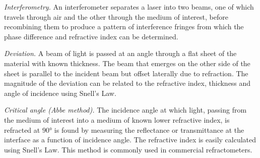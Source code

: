 \documentclass[
    aps,
    prl,
    reprint,
    10pt,
    amsmath,
    amssymb,
    a4paper,
    longbibliography
]{revtex4-2}
\begin{document}
\emph{Interferometry.} An interferometer separates a laser into two beams,
one of which travels through air and the other through the medium of
interest, before recombining them to produce a pattern of interference
fringes from which the phase difference and refractive index can be
determined.

\emph{Deviation.} A beam of light is passed at an angle through a flat
sheet of the material with known thickness. The beam that emerges on the
other side of the sheet is parallel to the incident beam but offset
laterally due to refraction. The magnitude of the deviation can be
related to the refractive index, thickness and angle of incidence using
Snell's Law.

\emph{Critical angle (Abbe method).} The incidence angle at which light,
passing from the medium of interest into a medium of known lower
refractive index, is refracted at $\ang{90}$ is found by measuring the
reflectance or transmittance at the interface as a function of
incidence angle. The refractive index is easily calculated using Snell's
Law. This method is commonly used in commercial refractometers.
\end{document}
